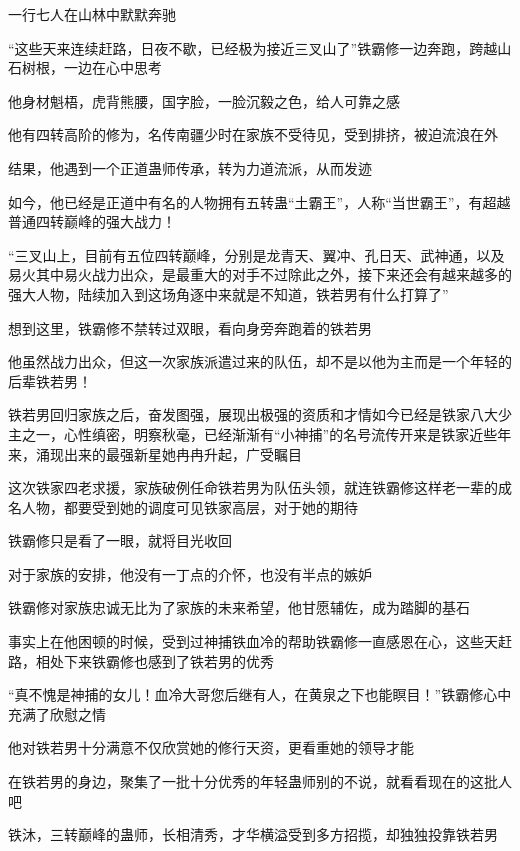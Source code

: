 
\begin{this_body}

一行七人在山林中默默奔驰

“这些天来连续赶路，日夜不歇，已经极为接近三叉山了”铁霸修一边奔跑，跨越山石树根，一边在心中思考

他身材魁梧，虎背熊腰，国字脸，一脸沉毅之色，给人可靠之感

他有四转高阶的修为，名传南疆少时在家族不受待见，受到排挤，被迫流浪在外

结果，他遇到一个正道蛊师传承，转为力道流派，从而发迹

如今，他已经是正道中有名的人物拥有五转蛊“土霸王”，人称“当世霸王”，有超越普通四转巅峰的强大战力！

“三叉山上，目前有五位四转巅峰，分别是龙青天、翼冲、孔日天、武神通，以及易火其中易火战力出众，是最重大的对手不过除此之外，接下来还会有越来越多的强大人物，陆续加入到这场角逐中来就是不知道，铁若男有什么打算了”

想到这里，铁霸修不禁转过双眼，看向身旁奔跑着的铁若男

他虽然战力出众，但这一次家族派遣过来的队伍，却不是以他为主而是一个年轻的后辈铁若男！

铁若男回归家族之后，奋发图强，展现出极强的资质和才情如今已经是铁家八大少主之一，心性缜密，明察秋毫，已经渐渐有“小神捕”的名号流传开来是铁家近些年来，涌现出来的最强新星她冉冉升起，广受瞩目

这次铁家四老求援，家族破例任命铁若男为队伍头领，就连铁霸修这样老一辈的成名人物，都要受到她的调度可见铁家高层，对于她的期待

铁霸修只是看了一眼，就将目光收回

对于家族的安排，他没有一丁点的介怀，也没有半点的嫉妒

铁霸修对家族忠诚无比为了家族的未来希望，他甘愿辅佐，成为踏脚的基石

事实上在他困顿的时候，受到过神捕铁血冷的帮助铁霸修一直感恩在心，这些天赶路，相处下来铁霸修也感到了铁若男的优秀

“真不愧是神捕的女儿！血冷大哥您后继有人，在黄泉之下也能瞑目！”铁霸修心中充满了欣慰之情

他对铁若男十分满意不仅欣赏她的修行天资，更看重她的领导才能

在铁若男的身边，聚集了一批十分优秀的年轻蛊师别的不说，就看看现在的这批人吧

铁沐，三转巅峰的蛊师，长相清秀，才华横溢受到多方招揽，却独独投靠铁若男


\end{this_body}
